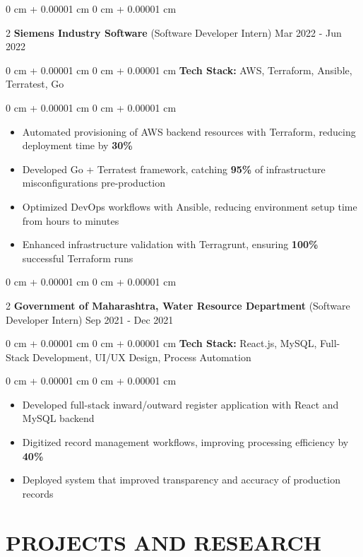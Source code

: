 \documentclass[9pt, letterpaper]{article}
\newenvironment{highlights}{
    \begin{itemize}[
        topsep=0.05 cm,
        parsep=0 pt,
        partopsep=0pt,
        itemsep=0pt,
        leftmargin=10pt
    ]
}{
    \end{itemize}
} %
\newenvironment{onecolentry}{
    \begin{adjustwidth}{
        0 cm + 0.00001 cm}{
        0 cm + 0.00001 cm}
}{
    \end{adjustwidth}
} %
\newenvironment{twocolentry}[2][]{
    \onecolentry
    \def\secondColumn{#2}
    \setcolumnwidth{\fill, 4.5 cm}
    \begin{paracol}{2}
}{
    \switchcolumn \raggedleft \secondColumn
    \end{paracol}
    \endonecolentry
} %
\begin{document}
    \begin{twocolentry}{Mar 2022 - Jun 2022}\textbf{Siemens Industry Software} (Software Developer Intern)\end{twocolentry}
    \begin{onecolentry}\textbf{Tech Stack:} AWS, Terraform, Ansible, Terratest, Go \end{onecolentry}
    \begin{onecolentry}
        \begin{highlights}
            \item Automated provisioning of AWS backend resources with Terraform, reducing deployment time by \textbf{30\%}
            \item Developed Go + Terratest framework, catching \textbf{95\%} of infrastructure misconfigurations pre-production
            \item Optimized DevOps workflows with Ansible, reducing environment setup time from hours to minutes
            \item Enhanced infrastructure validation with Terragrunt, ensuring \textbf{100\%} successful Terraform runs
        \end{highlights}
    \end{onecolentry}
    \vspace{0.04 cm}

    \begin{twocolentry}{Sep 2021 - Dec 2021}\textbf{Government of Maharashtra, Water Resource Department} (Software Developer Intern)\end{twocolentry}
    \begin{onecolentry}\textbf{Tech Stack:} React.js, MySQL, Full-Stack Development, UI/UX Design, Process Automation \end{onecolentry}
    \begin{onecolentry}
        \begin{highlights}
            \item Developed full-stack inward/outward register application with React and MySQL backend
            \item Digitized record management workflows, improving processing efficiency by \textbf{40\%}
            \item Deployed system that improved transparency and accuracy of production records
        \end{highlights}
    \end{onecolentry}

\section{PROJECTS AND RESEARCH}
\end{document}
